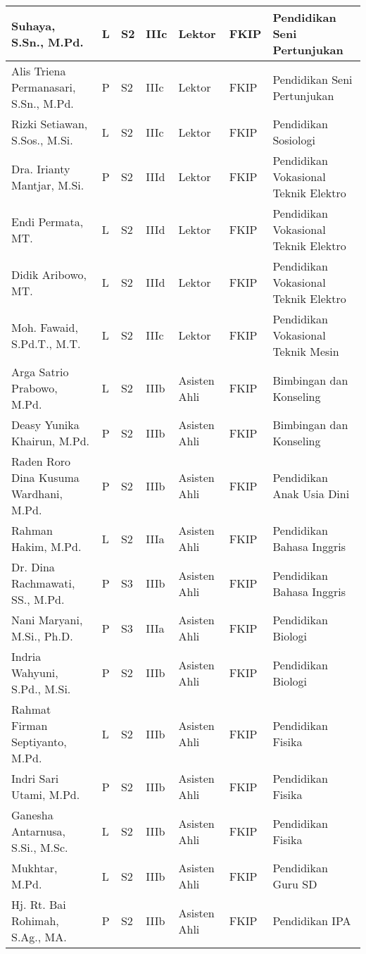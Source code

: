 \documentclass[
]{book}
\begin{document}
\begin{longtable}{l|l|l|l|l|l|l}
\hline
Suhaya, S.Sn., M.Pd. & L & S2 & IIIc & Lektor & FKIP & Pendidikan Seni Pertunjukan\\
\hline
Alis Triena Permanasari, S.Sn., M.Pd. & P & S2 & IIIc & Lektor & FKIP & Pendidikan Seni Pertunjukan\\
\hline
Rizki Setiawan, S.Sos., M.Si. & L & S2 & IIIc & Lektor & FKIP & Pendidikan Sosiologi\\
\hline
Dra. Irianty Mantjar, M.Si. & P & S2 & IIId & Lektor & FKIP & Pendidikan Vokasional Teknik Elektro\\
\hline
Endi Permata, MT. & L & S2 & IIId & Lektor & FKIP & Pendidikan Vokasional Teknik Elektro\\
\hline
Didik Aribowo, MT. & L & S2 & IIId & Lektor & FKIP & Pendidikan Vokasional Teknik Elektro\\
\hline
Moh. Fawaid, S.Pd.T., M.T. & L & S2 & IIIc & Lektor & FKIP & Pendidikan Vokasional Teknik Mesin\\
\hline
Arga Satrio Prabowo, M.Pd. & L & S2 & IIIb & Asisten Ahli & FKIP & Bimbingan dan Konseling\\
\hline
Deasy Yunika Khairun, M.Pd. & P & S2 & IIIb & Asisten Ahli & FKIP & Bimbingan dan Konseling\\
\hline
Raden Roro Dina Kusuma Wardhani, M.Pd. & P & S2 & IIIb & Asisten Ahli & FKIP & Pendidikan Anak Usia Dini\\
\hline
Rahman Hakim, M.Pd. & L & S2 & IIIa & Asisten Ahli & FKIP & Pendidikan Bahasa Inggris\\
\hline
Dr. Dina Rachmawati, SS., M.Pd. & P & S3 & IIIb & Asisten Ahli & FKIP & Pendidikan Bahasa Inggris\\
\hline
Nani Maryani, M.Si., Ph.D. & P & S3 & IIIa & Asisten Ahli & FKIP & Pendidikan Biologi\\
\hline
Indria Wahyuni, S.Pd., M.Si. & P & S2 & IIIb & Asisten Ahli & FKIP & Pendidikan Biologi\\
\hline
Rahmat Firman Septiyanto, M.Pd. & L & S2 & IIIb & Asisten Ahli & FKIP & Pendidikan Fisika\\
\hline
Indri Sari Utami, M.Pd. & P & S2 & IIIb & Asisten Ahli & FKIP & Pendidikan Fisika\\
\hline
Ganesha Antarnusa, S.Si., M.Sc. & L & S2 & IIIb & Asisten Ahli & FKIP & Pendidikan Fisika\\
\hline
Mukhtar, M.Pd. & L & S2 & IIIb & Asisten Ahli & FKIP & Pendidikan Guru SD\\
\hline
Hj. Rt. Bai Rohimah, S.Ag., MA. & P & S2 & IIIb & Asisten Ahli & FKIP & Pendidikan IPA\\

\end{longtable}
\end{document}
